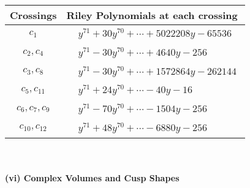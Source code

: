 \documentclass[1p]{elsarticle_modified}
\theoremstyle{definition}
\begin{document}
\begin{tabular}{m{50pt}|m{274pt}}
Crossings & \hspace{64pt}Riley Polynomials at each crossing \\
\hline $$\begin{aligned}c_{1}\end{aligned}$$&$\begin{aligned}
&y^{71}+30 y^{70}+\cdots+5022208 y-65536
\end{aligned}$\\
\hline $$\begin{aligned}c_{2},c_{4}\end{aligned}$$&$\begin{aligned}
&y^{71}-30 y^{70}+\cdots+4640 y-256
\end{aligned}$\\
\hline $$\begin{aligned}c_{3},c_{8}\end{aligned}$$&$\begin{aligned}
&y^{71}-30 y^{70}+\cdots+1572864 y-262144
\end{aligned}$\\
\hline $$\begin{aligned}c_{5},c_{11}\end{aligned}$$&$\begin{aligned}
&y^{71}+24 y^{70}+\cdots-40 y-16
\end{aligned}$\\
\hline $$\begin{aligned}c_{6},c_{7},c_{9}\end{aligned}$$&$\begin{aligned}
&y^{71}-70 y^{70}+\cdots-1504 y-256
\end{aligned}$\\
\hline $$\begin{aligned}c_{10},c_{12}\end{aligned}$$&$\begin{aligned}
&y^{71}+48 y^{70}+\cdots-6880 y-256
\end{aligned}$\\
\hline
\end{tabular}\\~\\
\newpage\flushleft \textbf{(vi) Complex Volumes and Cusp Shapes}
\end{document}
